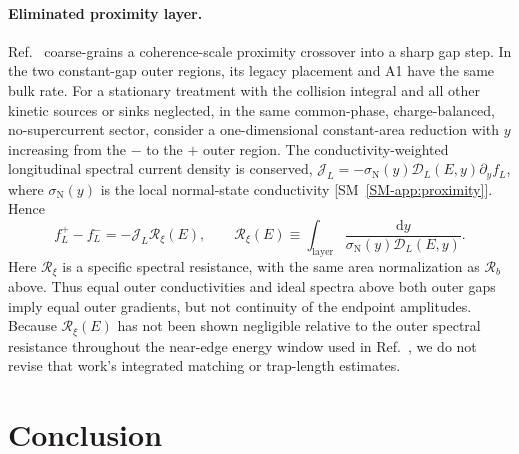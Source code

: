 \documentclass[
  aps,
  prb,
  preprint,
  superscriptaddress,
  longbibliography,
  nofootinbib
]{revtex4-2}
\newcommand{\dd}{\mathrm{d}}
\newcommand{\fL}{f_L}
\begin{document}
\paragraph{Eliminated proximity layer.}
Ref.~ coarse-grains a coherence-scale proximity
crossover into a sharp gap step. In the two constant-gap outer regions,
its legacy placement and A1 have the same bulk rate. For a stationary
treatment with the collision integral and all other kinetic sources or
sinks neglected, in the same common-phase, charge-balanced,
no-supercurrent sector, consider a one-dimensional constant-area reduction
with \(y\) increasing from the \(-\) to the \(+\) outer region. The
conductivity-weighted longitudinal spectral current density is conserved,
\(\mathcal J_L=-\sigma_{\mathrm N}(y)\mathcal D_L(E,y)
\partial_y\fL\), where \(\sigma_{\mathrm N}(y)\) is the local
normal-state conductivity [SM~\cref{SM-app:proximity}]. Hence
\begin{equation}
  \fL^{+}-\fL^{-}
  =-\mathcal J_L\mathcal R_{\xi}(E),
  \qquad
  \mathcal R_{\xi}(E)
  \equiv\int_{\mathrm{layer}}
  \frac{\dd y}{\sigma_{\mathrm N}(y)\mathcal D_L(E,y)} .
  \label{eq:proximity_layer_resistance}
\end{equation}
Here \(\mathcal R_{\xi}\) is a specific spectral resistance, with the
same area normalization as \(\mathcal R_b\) above.
Thus equal outer conductivities and ideal spectra above both outer gaps
imply equal outer gradients, but not continuity of the endpoint
amplitudes. Because \(\mathcal R_{\xi}(E)\) has not been shown negligible
relative to the outer spectral resistance throughout the near-edge
energy window used in Ref.~, we do not revise that
work's integrated matching or trap-length estimates.

\section{Conclusion}
\end{document}
